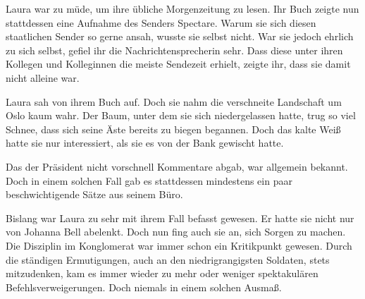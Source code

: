  Laura war zu müde, um ihre übliche Morgenzeitung zu lesen. Ihr Buch zeigte nun stattdessen eine Aufnahme des Senders Spectare. Warum sie sich diesen staatlichen Sender so gerne ansah, wusste sie selbst nicht. War sie jedoch ehrlich zu sich selbst, gefiel ihr die Nachrichtensprecherin sehr. Dass diese unter ihren Kollegen und Kolleginnen die meiste Sendezeit erhielt, zeigte ihr, dass sie damit nicht alleine war.

\par


\par

Laura sah von ihrem Buch auf. Doch sie nahm die verschneite Landschaft um Oslo kaum wahr. Der Baum, unter dem sie sich niedergelassen hatte, trug so viel Schnee, dass sich seine Äste bereits zu biegen begannen. Doch das kalte Weiß hatte sie nur interessiert, als sie es von der Bank gewischt hatte.

\par

Das der Präsident nicht vorschnell Kommentare abgab, war allgemein bekannt. Doch in einem solchen Fall gab es stattdessen mindestens ein paar beschwichtigende Sätze aus seinem Büro.

\par


\par

Bislang war Laura zu sehr mit ihrem Fall befasst gewesen. Er hatte sie nicht nur von Johanna Bell abelenkt. Doch nun fing auch sie an, sich Sorgen zu machen. Die Disziplin im Konglomerat war immer schon ein Kritikpunkt gewesen. Durch die ständigen Ermutigungen, auch an den niedrigrangigsten Soldaten, stets mitzudenken, kam es immer wieder zu mehr oder weniger spektakulären Befehlsverweigerungen. Doch niemals in einem solchen Ausmaß.

